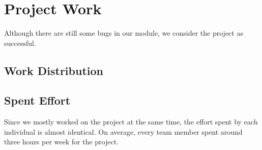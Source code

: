 \documentclass{article}
\begin{document}
\section{Project Work}
Although there are still some bugs in our module, we consider the project as successful.

\subsection{Work Distribution}

\subsection{Spent Effort}
Since we mostly worked on the project at the same time, the effort spent by each individual is
almost identical. On average, every team member spent around three hours per week for the project.

\noindent
\end{document}
